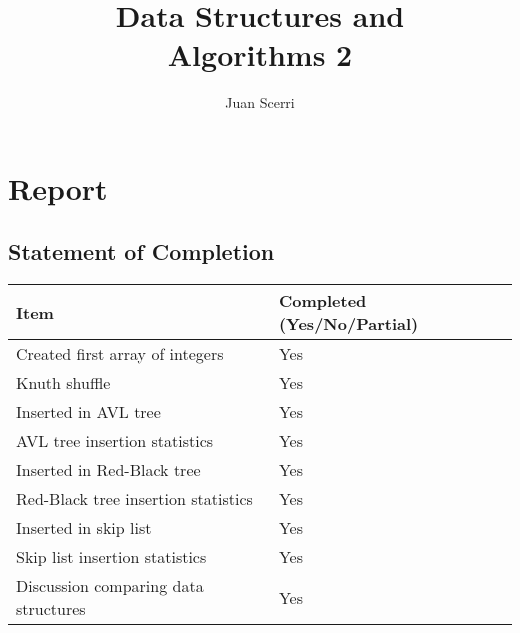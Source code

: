 \documentclass[article]{uom-coursework}
\title{Data Structures and\\Algorithms 2}
\author{Juan Scerri}
\begin{document}

\pagestyle{umpage}

\frontmatter

\maketitle %

\tableofcontents %

\clearpage

\lstlistoflistings

\clearpage

\mainmatter


\chapter*{Report}
\label{chap:report}

\section{Statement of Completion}

\begin{center}
\begin{tabular}{|l|l|} 
\hline
\textbf{Item} & \textbf{Completed (Yes/No/Partial)}\\
\hline
Created first array of integers & Yes \\
\hline
Knuth shuffle & Yes \\
\hline
Inserted in AVL tree & Yes \\
\hline
AVL tree insertion statistics & Yes \\
\hline
Inserted in Red-Black tree & Yes \\
\hline
Red-Black tree insertion statistics & Yes \\
\hline
Inserted in skip list & Yes \\
\hline
Skip list insertion statistics & Yes \\
\hline
Discussion comparing data structures & Yes \\
\hline
\end{tabular}
\end{center}
\end{document}
